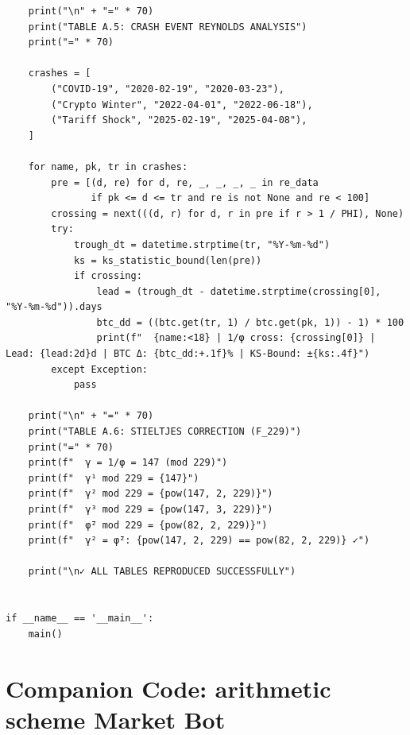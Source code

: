 \begin{verbatim}
    print("\n" + "=" * 70)
    print("TABLE A.5: CRASH EVENT REYNOLDS ANALYSIS")
    print("=" * 70)

    crashes = [
        ("COVID-19", "2020-02-19", "2020-03-23"),
        ("Crypto Winter", "2022-04-01", "2022-06-18"),
        ("Tariff Shock", "2025-02-19", "2025-04-08"),
    ]

    for name, pk, tr in crashes:
        pre = [(d, re) for d, re, _, _, _, _ in re_data
               if pk <= d <= tr and re is not None and re < 100]
        crossing = next(((d, r) for d, r in pre if r > 1 / PHI), None)
        try:
            trough_dt = datetime.strptime(tr, "%Y-%m-%d")
            ks = ks_statistic_bound(len(pre))
            if crossing:
                lead = (trough_dt - datetime.strptime(crossing[0], "%Y-%m-%d")).days
                btc_dd = ((btc.get(tr, 1) / btc.get(pk, 1)) - 1) * 100
                print(f"  {name:<18} | 1/φ cross: {crossing[0]} | Lead: {lead:2d}d | BTC Δ: {btc_dd:+.1f}% | KS-Bound: ±{ks:.4f}")
        except Exception:
            pass

    print("\n" + "=" * 70)
    print("TABLE A.6: STIELTJES CORRECTION (F_229)")
    print("=" * 70)
    print(f"  γ = 1/φ = 147 (mod 229)")
    print(f"  γ¹ mod 229 = {147}")
    print(f"  γ² mod 229 = {pow(147, 2, 229)}")
    print(f"  γ³ mod 229 = {pow(147, 3, 229)}")
    print(f"  φ̄² mod 229 = {pow(82, 2, 229)}")
    print(f"  γ² = φ̄²: {pow(147, 2, 229) == pow(82, 2, 229)} ✓")

    print("\n✓ ALL TABLES REPRODUCED SUCCESSFULLY")


if __name__ == '__main__':
    main()
\end{verbatim}


\section*{Companion Code: arithmetic scheme Market Bot}

